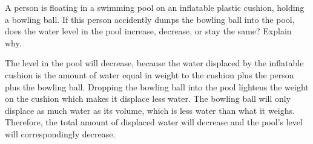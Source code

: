 

A person is floating in a swimming pool on an inflatable plastic cushion, holding a bowling ball.  If this person accidently dumps the bowling ball into the pool, does the water level in the pool increase, decrease, or stay the same?  Explain why.







The level in the pool will decrease, because the water displaced by the inflatable cushion is the amount of water equal in weight to the cushion plus the person plus the bowling ball.  Dropping the bowling ball into the pool lightens the weight on the cushion which makes it displace less water.  The bowling ball will only displace as much water as its volume, which is less water than what it weighs.  Therefore, the total amount of displaced water will decrease and the pool's level will correspondingly decrease.











